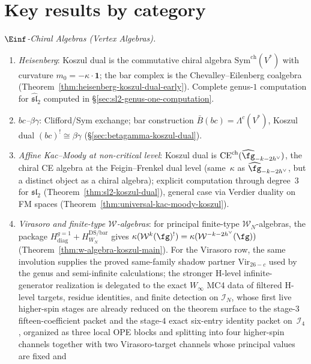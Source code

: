 \section*{Key results by category}

\emph{$\Einf$-Chiral Algebras (Vertex Algebras).}

\begin{enumerate}[label=(\roman*)]
\item \emph{Heisenberg}: Koszul dual is the commutative chiral algebra
$\mathrm{Sym}^{\mathrm{ch}}(V^*)$ with curvature $m_0 = -\kappa \cdot \mathbf{1}$;
the bar complex is the Chevalley--Eilenberg coalgebra
(Theorem~\ref{thm:heisenberg-koszul-dual-early}).
Complete genus-$1$ computation for $\widehat{\mathfrak{sl}}_2$ computed
in \S\ref{sec:sl2-genus-one-computation}.
\item \emph{$bc$--$\beta\gamma$}: Clifford/Sym exchange;
bar construction $\bar{B}(bc) = \Lambda^c(V^*)$, Koszul dual
$(bc)^! \cong \beta\gamma$
(\S\ref{sec:betagamma-koszul-dual}).
\item \emph{Affine Kac--Moody at non-critical level}: Koszul dual is
$\mathrm{CE}^{\mathrm{ch}}(\widehat{\fg}_{-k-2h^\vee})$,
the chiral CE algebra at the Feigin--Frenkel dual level
(same~$\kappa$ as $\widehat{\fg}_{-k-2h^\vee}$, but a
distinct object as a chiral algebra); explicit computation through degree~$3$
for $\mathfrak{sl}_2$ (Theorem~\ref{thm:sl2-koszul-dual}),
general case via Verdier duality on FM spaces
(Theorem~\ref{thm:universal-kac-moody-koszul}).
\item \emph{Virasoro and finite-type $\mathcal{W}$-algebras}:
for principal finite-type $\mathcal{W}_N$-algebras, the package
$H_{\mathrm{diag}}^{g=1}+H_{W_N}^{\mathrm{DS/bar}}$ gives
$\kappa(\mathcal{W}^k(\fg)^!) = \kappa(\mathcal{W}^{-k-2h^\vee}(\fg))$
\textup{(}Theorem~\ref{thm:w-algebra-koszul-main}\textup{)}.
For the Virasoro row, the same involution supplies the proved
same-family shadow partner $\mathrm{Vir}_{26-c}$ used by the
genus and semi-infinite calculations; the stronger H-level
infinite-generator realization is delegated to the exact
$W_\infty$ MC4 data of filtered H-level targets, residue identities,
and finite detection on $\mathcal{I}_N$, whose first live
higher-spin stages are already reduced on the theorem surface to the
stage-$3$ fifteen-coefficient packet and the stage-$4$
exact six-entry identity packet on~$\mathcal{I}_4$, organized as three
local OPE blocks and splitting into four higher-spin channels together
with two Virasoro-target channels whose principal values are fixed and

\end{enumerate}
